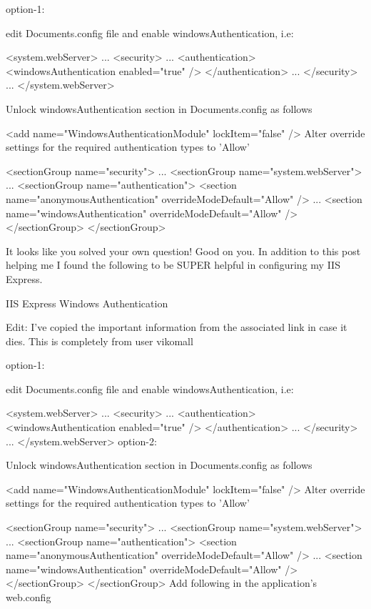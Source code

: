 option-1:

edit \My Documents\IISExpress\config\applicationhost.config file and enable windowsAuthentication, i.e:

<system.webServer>
...
  <security>
...
    <authentication>
      <windowsAuthentication enabled="true" />
    </authentication>
...
  </security>
...
</system.webServer>

Unlock windowsAuthentication section in \My Documents\IISExpress\config\applicationhost.config as follows

<add name="WindowsAuthenticationModule" lockItem="false" />
Alter override settings for the required authentication types to 'Allow'

<sectionGroup name="security">
    ...
    <sectionGroup name="system.webServer">
        ...
        <sectionGroup name="authentication">
            <section name="anonymousAuthentication" overrideModeDefault="Allow" />
            ...
            <section name="windowsAuthentication" overrideModeDefault="Allow" />
    </sectionGroup>
</sectionGroup>

	
It looks like you solved your own question! Good on you. In addition to this post helping me I found the following to be SUPER helpful in configuring my IIS Express.

IIS Express Windows Authentication

Edit: I've copied the important information from the associated link in case it dies. This is completely from user vikomall

option-1:

edit \My Documents\IISExpress\config\applicationhost.config file and enable windowsAuthentication, i.e:

<system.webServer>
...
  <security>
...
    <authentication>
      <windowsAuthentication enabled="true" />
    </authentication>
...
  </security>
...
</system.webServer>
option-2:

Unlock windowsAuthentication section in \My Documents\IISExpress\config\applicationhost.config as follows

<add name="WindowsAuthenticationModule" lockItem="false" />
Alter override settings for the required authentication types to 'Allow'

<sectionGroup name="security">
    ...
    <sectionGroup name="system.webServer">
        ...
        <sectionGroup name="authentication">
            <section name="anonymousAuthentication" overrideModeDefault="Allow" />
            ...
            <section name="windowsAuthentication" overrideModeDefault="Allow" />
    </sectionGroup>
</sectionGroup>
Add following in the application's web.config

